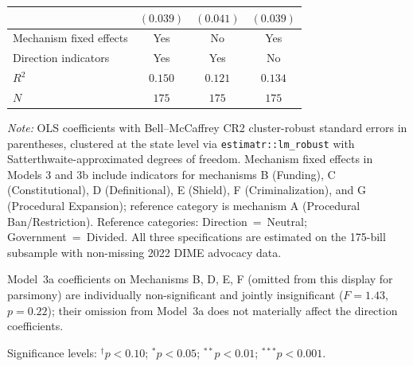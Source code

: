\documentclass[12pt]{report}
\begin{document}
\begin{table}[htbp]
\begin{threeparttable}
\begin{tabular}{lccc}
                                     & $(0.039)$          & $(0.041)$          & $(0.039)$          \\[4pt]
\midrule
Mechanism fixed effects              & Yes                & No                 & Yes                \\
Direction indicators                 & Yes                & Yes                & No                 \\
$R^{2}$                              & $0.150$            & $0.121$            & $0.134$            \\
$N$                                  & $175$              & $175$              & $175$              \\
\bottomrule
\end{tabular}
\begin{tablenotes}
\footnotesize
\item \textit{Note:} OLS coefficients with Bell--McCaffrey CR2 cluster-robust standard
  errors in parentheses, clustered at the state level via \texttt{estimatr::lm\_robust}
  with Satterthwaite-approximated degrees of freedom. Mechanism fixed effects in Models
  3 and 3b include indicators for mechanisms B (Funding), C (Constitutional), D
  (Definitional), E (Shield), F (Criminalization), and G (Procedural Expansion);
  reference category is mechanism A (Procedural Ban/Restriction). Reference categories:
  Direction~=~Neutral; Government~=~Divided. All three specifications are estimated on
  the 175-bill subsample with non-missing 2022 DIME advocacy data.
\item Model~3a coefficients on Mechanisms B, D, E, F (omitted from this display for
  parsimony) are individually non-significant and jointly insignificant ($F = 1.43$,
  $p = 0.22$); their omission from Model~3a does not materially affect the direction
  coefficients.
\item Significance levels: $^{\dagger}p<0.10$; $^{*}p<0.05$; $^{**}p<0.01$;
  $^{***}p<0.001$.
\end{tablenotes}
\end{threeparttable}
\end{table}
\end{document}
